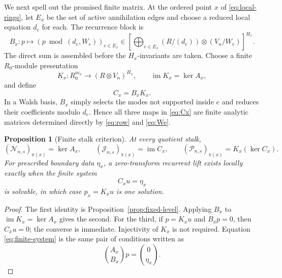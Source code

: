 \documentclass[11pt,reqno]{amsart}
\newtheorem{proposition}[theorem]{Proposition}
\theoremstyle{definition}
\theoremstyle{remark}
\newcommand{\im}{\operatorname{im}}
\begin{document}
We next spell out the promised finite matrix.  At the ordered point $x$ of
\eqref{eq:local-rings}, let $E_x$ be the set of active annihilation edges and
choose a reduced local equation $d_e$ for each.  The recurrence block is
\begin{equation}
 B_x:p\longmapsto
 \left(p\bmod(d_e,W_e)\right)_{e\in E_x}
 \in\left[
 \bigoplus_{e\in E_x}(R/(d_e))\otimes(V_n/W_e)
 \right]^{H_x}.
 \label{eq:Bx}
\end{equation}
The direct sum is assembled before the $H_x$-invariants are taken.  Choose a
finite $R_0$-module presentation
\begin{equation}
 K_x:R_0^{m_x}\longrightarrow(R\otimes V_n)^{H_x},
 \qquad \im K_x=\ker A_x,
 \label{eq:Kx}
\end{equation}
and define
\begin{equation}
 C_x=B_xK_x.
 \label{eq:Cx}
\end{equation}
In a Walsh basis, $B_x$ simply selects the modes not supported inside $e$ and
reduces their coefficients modulo $d_e$.  Hence all three maps in
\eqref{eq:Cx} are finite analytic matrices determined directly by
\eqref{eq:row} and \eqref{eq:We}.

\begin{proposition}[Finite stalk criterion]
\label{prop:finite-stalk}
At every quotient stalk,
\begin{equation}
 (\mathscr N_{n,s})_{\pi(x)}=\ker A_x,
 \qquad
 (\mathscr J_{n,s})_{\pi(x)}=\im C_x,
 \qquad
 (\mathscr P_{n,s})_{\pi(x)}=K_x(\ker C_x).
 \label{eq:NJP-stalk}
\end{equation}
For prescribed boundary data $\eta_x$, a zero-transform recurrent lift exists
locally exactly when the finite system
\begin{equation}
 C_xu=\eta_x
 \label{eq:finite-system}
\end{equation}
is solvable, in which case $p_x=K_xu$ is one solution.
\end{proposition}

\begin{proof}
The first identity is Proposition~\ref{prop:fixed-level}.  Applying $B_x$ to
$\im K_x=\ker A_x$ gives the second.  For the third, if $p=K_xu$ and
$B_xp=0$, then $C_xu=0$; the converse is immediate.  Injectivity of $K_x$ is
not required.  Equation \eqref{eq:finite-system} is the same pair of
conditions written as
\begin{equation}
 \binom{A_x}{B_x}p=\binom0{\eta_x}.
\end{equation}
\end{proof}
\end{document}
